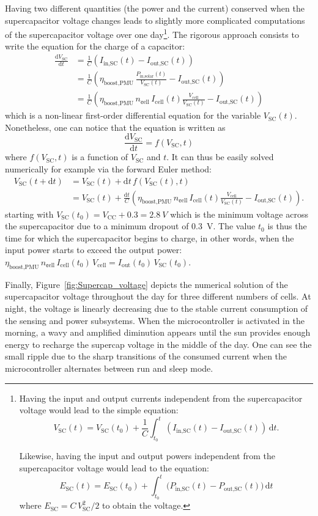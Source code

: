 \documentclass{EPL-master-thesis-covers-EN}
\newcommand{\te}[1]{\textrm{#1}}
\begin{document}
Having two different quantities (the power and the current) conserved when the supercapacitor voltage changes leads to slightly more complicated computations of the supercapacitor voltage over one day\footnote{Having the input and output currents independent from the supercapacitor voltage would lead to the simple equation: $$V_\te{SC}(t) = V_\te{SC}(t_0) + \frac{1}{C} \int_{t_0}^t (I_\te{in,SC}(t) - I_\te{out,SC}(t))\, \te{d}t.$$

Likewise, having the input and output powers independent from the supercapacitor voltage would lead to the equation: $$E_\te{SC}(t) = E_\te{SC}(t_0) + \int_{t_0}^t \big(P_\te{in,SC}(t) - P_\te{out,SC}(t)\big)\, \te{d}t$$ where $E_\te{SC} = C\, V_\te{SC}^2 / 2$ to obtain the voltage.}. The rigorous approach consists to write the equation for the charge of a capacitor:
\begin{align*}
 \frac{\te{d}V_\te{SC}}{\te{d}t} &= \frac{1}{C} \left( I_\te{in,SC}(t) - I_\te{out,SC}(t) \right) \\
 &= \frac{1}{C} \left( \eta_\te{boost,PMU} \, \frac{P_\te{in,solar}(t)}{V_\te{SC}(t)} - I_\te{out,SC}(t) \right) \\
 &= \frac{1}{C} \left( \eta_\te{boost,PMU} \, n_\te{¢ell} \, I_\te{cell}(t) \frac{V_\te{cell}}{V_\te{SC}(t)} - I_\te{out,SC}(t) \right)
\end{align*}
which is a non-linear first-order differential equation for the variable $V_\te{SC}(t)$. Nonetheless, one can notice that the equation is written as
\[
 \frac{\te{d}V_\te{SC}}{\te{d}t} = f(V_\te{SC}, t)
\]
where $f(V_\te{SC}, t)$ is a function of $V_\te{SC}$ and $t$. It can thus be easily solved numerically for example via the forward Euler method: 
\begin{align*}
 V_\te{SC}(t + \te{d}t) &= V_\te{SC}(t) + \te{d}t \, f(V_\te{SC}(t), t) \\
 &= V_\te{SC}(t) + \frac{\te{d}t}{C} \left( \eta_\te{boost,PMU} \, n_\te{¢ell} \, I_\te{cell}(t) \frac{V_\te{cell}}{V_\te{SC}(t)} - I_\te{out,SC}(t) \right).
\end{align*}
starting with $V_\te{SC}(t_0) = V_\te{CC} + 0.3 = \SI{2.8}{V}$ which is the minimum voltage across the supercapacitor due to a minimum dropout of \SI{0.3}{V}. The value $t_0$ is thus the time for which the supercapacitor begins to charge, in other words, when the input power starts to exceed the output power: $\eta_\te{boost,PMU} \, n_\te{¢ell} \, I_\te{cell}(t_0)\,V_\te{cell} = I_\te{out}(t_0) \, V_\te{SC}(t_0)$.

Finally, Figure~\ref{fig:Supercap_voltage} depicts the numerical solution of the supercapacitor voltage throughout the day for three different numbers of cells. At night, the voltage is linearly decreasing due to the stable current consumption of the sensing and power subsystems. When the microcontroller is activated in the morning, a wavy and amplified diminution appears until the sun provides enough energy to recharge the supercap voltage in the middle of the day. One can see the small ripple due to the sharp transitions of the consumed current when the microcontroller alternates between run and sleep mode.
\end{document}
